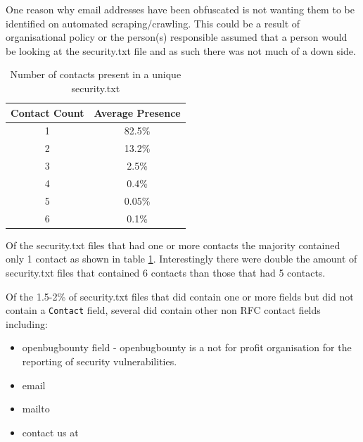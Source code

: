 \documentclass{mscreport}
\begin{document}
\noindent
One reason why email addresses have been obfuscated is not wanting them to be identified on automated scraping/crawling. This could be a result of organisational policy or the person(s) responsible assumed that a person would be looking at the security.txt file and as such there was not much of a down side.

\begin{table}[H]
  \begin{center}
    \begin{tabular}{|c|c|}  %
      \hline
      \textbf{Contact Count} & \textbf{Average Presence}\\
      \hline
      1 & 82.5\%\\
      \hline
      2 & 13.2\%\\
      \hline
      3 & 2.5\%\\
      \hline
      4 & 0.4\%\\
      \hline
      5 & 0.05\%\\
      \hline
      6 & 0.1\%\\
      \hline
    \end{tabular}
    \caption{Number of contacts present in a unique security.txt}
    \label{table:security_txt_by_contact_count} %
  \end{center}
\end{table}

\noindent
Of the security.txt files that had one or more contacts the majority contained only 1 contact as shown in table \ref{table:security_txt_by_contact_count}. Interestingly there were double the amount of security.txt files that contained 6 contacts than those that had 5 contacts.

\vspace{0.3cm} \noindent
Of the 1.5-2\% of security.txt files that did contain one or more fields but did not contain a \texttt{Contact} field, several did contain other non RFC contact fields including:

\clearpage
\newpage

\begin{itemize}
	\setlength\itemsep{0.01em}
    \item openbugbounty field - openbugbounty is a not for profit organisation for the reporting of security vulnerabilities.
    \item email
    \item mailto
    \item contact us at
\end{itemize}
\end{document}
